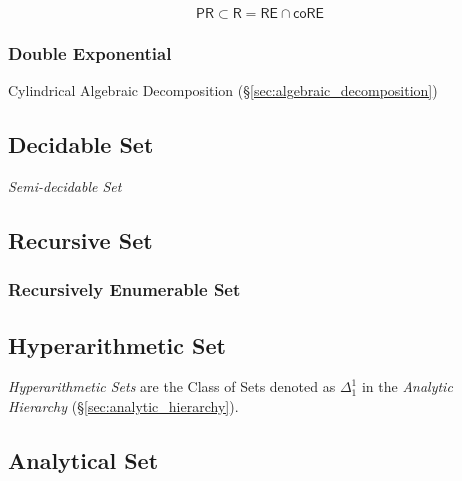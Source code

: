 \[
  \mathsf{PR} \subset \mathsf{R} = \mathsf{RE} \cap \mathsf{coRE}
\]



\subsubsection{Double Exponential}\label{sec:double_exponential}

Cylindrical Algebraic Decomposition
(\S\ref{sec:algebraic_decomposition})



\subsection{Decidable Set}\label{sec:decidable_set}

\emph{Semi-decidable Set}



\subsection{Recursive Set}\label{sec:recursive_set}

\subsubsection{Recursively Enumerable Set}\label{sec:recursively_enumerable}



\subsection{Hyperarithmetic Set}\label{sec:hyperarithmetic_set}

\emph{Hyperarithmetic Sets} are the Class of Sets denoted as
$\Delta^1_1$ in the \emph{Analytic Hierarchy}
(\S\ref{sec:analytic_hierarchy}).



\subsection{Analytical Set}\label{sec:analytical_set}



